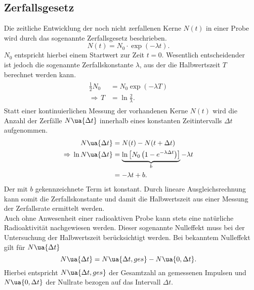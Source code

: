 \subsection{Zerfallsgesetz}
Die zeitliche Entwicklung der noch nicht zerfallenen Kerne $N(t)$ in einer Probe wird durch das sogenannte
Zerfallsgesetz beschrieben.
\begin{equation}
  N(t) = N_0 \cdot \exp\left(-\lambda t  \right).
  \label{eq: zerfallsgesetz}
\end{equation}
$N_0$ entspricht hierbei einem Startwert zur Zeit $t = 0$. Wesentlich entscheidender ist jedoch die sogenannte Zerfallskonstante $\lambda$,
aus der die Halbwertszeit $T$ berechnet werden kann.
\begin{align}
  \begin{aligned}
    \frac{1}{2} N_0 &= N_0 \exp\left(-\lambda T \right) \\
    \Rightarrow \, T &= \ln\frac{2}{\lambda}.
  \end{aligned}
  \label{eq: halbwertszeit}
\end{align}
Statt einer kontinuierlichen Messung der vorhandenen Kerne $N(t)$ wird die Anzahl der Zerfälle $N\ua{\Delta t}$ innerhalb eines
konstanten Zeitintervalls $\Delta t$ aufgenommen.
\begin{align}
  N\ua{\Delta t} &= N(t) - N(t + \Delta t) \\
  \Rightarrow \, \ln N\ua{\Delta t} &= \underbrace{\ln\left[N_0\left(1 - e^{-\lambda \Delta t} \right) \right]}_{b} - \lambda t \label{eq: n_prozeitintervall}\\
  &= -\lambda t + b.
\end{align}
Der mit $b$ gekennzeichnete Term ist konstant. Durch lineare Ausgleichsrechnung kann somit die Zerfallskonstante und damit die
Halbwertszeit aus einer Messung der Zerfallsrate ermittelt werden. \\
Auch ohne Anwesenheit einer radioaktiven Probe kann stets eine natürliche Radioaktivität nachgewiesen werden. Dieser sogenannte
Nulleffekt muss bei der Untersuchung der Halbwertszeit berücksichtigt werden.
Bei bekanntem Nulleffekt gilt für $N\ua{\Delta t}$
\begin{equation}
  N\ua{\Delta t} = N\ua{\Delta t, ges} - N\ua{0, \Delta t}.
  \label{eq: nullrate}
\end{equation}
Hierbei entspricht $N\ua{\Delta t, ges}$ der Gesamtzahl an gemessenen Impulsen und $N\ua{0, \Delta t}$ der Nullrate
bezogen auf das Intervall $\Delta t$.
